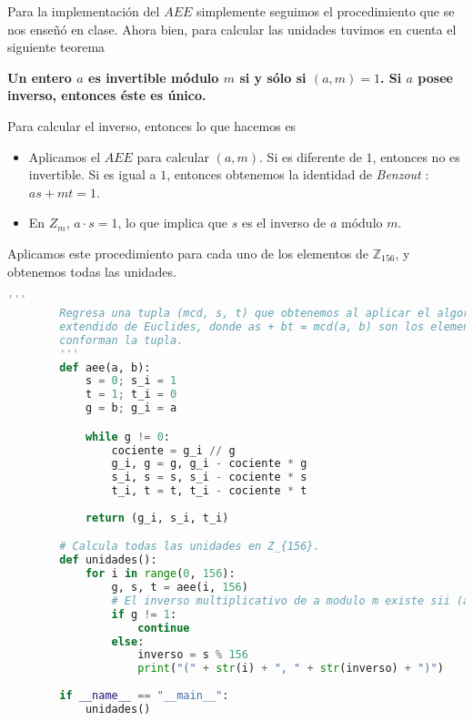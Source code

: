 \documentclass[letterpaper,11pt]{article}
\begin{document}
\begin{enumerate}
    Para la implementación del $AEE$ simplemente seguimos el procedimiento que
    se nos enseñó en clase. Ahora bien, para calcular las unidades tuvimos
    en cuenta el siguiente teorema
    \begin{center}
        \textbf{Un entero $a$ es invertible módulo $m$ si y sólo si 
        $(a,m) = 1$. Si $a$ posee inverso, entonces éste es único.}
    \end{center}
   
    Para calcular el inverso, entonces lo que hacemos es
    \begin{itemize}
        \item Aplicamos el $AEE$ para calcular $(a, m)$. Si es diferente de $1$,
        entonces no es invertible. Si es igual a $1$, entonces obtenemos la
        identidad de \textit{Benzout} : $as + mt = 1$.
        
        \item En $Z_{m}$, $a \cdot s = 1$, lo que implica que $s$ es el inverso
        de $a$ módulo $m$.
    \end{itemize}
    
    Aplicamos este procedimiento para cada uno de los elementos de 
    $\mathbb{Z}_{156}$, y obtenemos todas las unidades. 

    \begin{lstlisting}[language=Python]
        '''
        Regresa una tupla (mcd, s, t) que obtenemos al aplicar el algoritmo 
        extendido de Euclides, donde as + bt = mcd(a, b) son los elementos que 
        conforman la tupla.
        '''
        def aee(a, b):
            s = 0; s_i = 1
            t = 1; t_i = 0
            g = b; g_i = a

            while g != 0:
                cociente = g_i // g
                g_i, g = g, g_i - cociente * g
                s_i, s = s, s_i - cociente * s
                t_i, t = t, t_i - cociente * t
                
            return (g_i, s_i, t_i)

        # Calcula todas las unidades en Z_{156}.
        def unidades():
            for i in range(0, 156):
                g, s, t = aee(i, 156)
                # El inverso multiplicativo de a modulo m existe sii (a,m) = 1
                if g != 1:
                    continue 
                else:
                    inverso = s % 156
                    print("(" + str(i) + ", " + str(inverso) + ")")
            
        if __name__ == "__main__":
            unidades()
    \end{lstlisting}
    

\end{enumerate}
\end{document}
